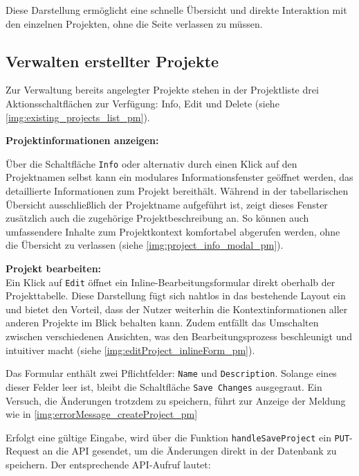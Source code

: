 
Diese Darstellung ermöglicht eine schnelle Übersicht und direkte Interaktion mit den einzelnen Projekten, ohne die Seite verlassen zu müssen.

\subsection*{Verwalten erstellter Projekte}

Zur Verwaltung bereits angelegter Projekte stehen in der Projektliste drei Aktionsschaltflächen zur Verfügung: Info, Edit und Delete (siehe \autoref{img:existing_projects_list_pm}).

\textbf{Projektinformationen anzeigen:}

Über die Schaltfläche \texttt{Info} oder alternativ durch einen Klick auf den Projektnamen selbst kann ein modulares Informationsfenster geöffnet werden, das detaillierte Informationen zum Projekt bereithält. Während in der tabellarischen Übersicht ausschließlich der Projektname aufgeführt ist, zeigt dieses Fenster zusätzlich auch die zugehörige Projektbeschreibung an. So können auch umfassendere Inhalte zum Projektkontext komfortabel abgerufen werden, ohne die Übersicht zu verlassen (siehe \autoref{img:project_info_modal_pm}).


\textbf{Projekt bearbeiten:}\\
Ein Klick auf \texttt{Edit} öffnet ein Inline-Bearbeitungsformular direkt oberhalb der Projekttabelle. Diese Darstellung fügt sich nahtlos in das bestehende Layout ein und bietet den Vorteil, dass der Nutzer weiterhin die Kontextinformationen aller anderen Projekte im Blick behalten kann. Zudem entfällt das Umschalten zwischen verschiedenen Ansichten, was den Bearbeitungsprozess beschleunigt und intuitiver macht (siehe \autoref{img:editProject_inlineForm_pm}).


Das Formular enthält zwei Pflichtfelder: \texttt{Name} und \texttt{Description}. Solange eines dieser Felder leer ist, bleibt die Schaltfläche \texttt{Save Changes} ausgegraut. Ein Versuch, die Änderungen trotzdem zu speichern, führt zur Anzeige der Meldung wie in \autoref{img:errorMessage_createProject_pm}

\newpage
Erfolgt eine gültige Eingabe, wird über die Funktion \texttt{handleSaveProject} ein \texttt{PUT}-Request an die API gesendet, um die Änderungen direkt in der Datenbank zu speichern. Der entsprechende API-Aufruf lautet:

